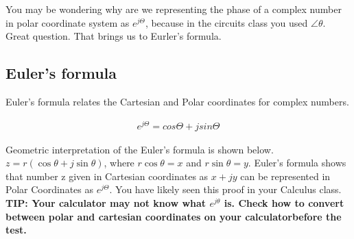 \documentclass{ximera}
\begin{document}
You may be wondering why are we representing the phase of a complex number in polar coordinate system as  $e^{j \Theta}$, because in the circuits class you used $\angle \theta$. Great question. That brings us to Eurler's formula.

  
 \subsection{Euler's formula} 
  
  

 Euler's formula relates the Cartesian and Polar coordinates for complex numbers.

\begin{eqnarray}
e^{j \Theta} = cos \Theta + j sin \Theta
\end{eqnarray}

Geometric interpretation of the Euler's formula is shown below. $z=r ( \cos{\theta} + j \sin{\theta})$, where $r \cos{\theta}=x$ and $r \sin{\theta}=y$. Euler's formula shows that number z given in Cartesian coordinates as $x+jy$ can be represented in Polar Coordinates as   $e^{j \Theta}$. You have likely seen this proof in your Calculus class.  {\bf TIP: Your calculator may not know what $e^{j\theta}$ is. Check how to convert between polar and cartesian coordinates on your calculatorbefore the test.}
\end{document}
